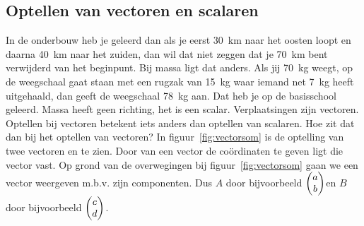 \documentclass[../main.tex]{subfiles}
\begin{document}
\begin{mdframed}[style=wiskader,frametitle=\section*{Wiskundekader~1: vectoren}]
\subsection*{Optellen van vectoren en scalaren}
In de onderbouw heb je geleerd dan als je eerst \SI{30}{\kilo\meter} naar het oosten loopt en daarna \SI{40}{\kilo\meter} naar het zuiden, dan wil dat niet zeggen dat je \SI{70}{\kilo\meter} bent verwijderd van het beginpunt. Bij massa ligt dat anders. Als jij \SI{70}{\kilo\gram} weegt, op de weegschaal gaat staan met een rugzak van \SI{15}{\kilo\gram} waar iemand net \SI{7}{\kilo\gram} heeft uitgehaald, dan geeft de weegschaal \SI{78}{\kilo\gram} aan. Dat heb je op de basisschool geleerd. Massa heeft geen richting, het is een scalar.  Verplaatsingen zijn vectoren. Optellen bij vectoren betekent iets anders dan optellen van scalaren. Hoe zit dat dan bij het optellen van vectoren? In figuur~\ref{fig:vectorsom} is de optelling van twee vectoren  en  te zien.
\iffalse%
\marginnote{\vspace{5cm}\texttt{[image: ./img/vectorsom.png]}
 \captionof{figure}{Optellen van vectoren.
Parallellogram-methode of kop aan staart methode. Maar ook is mogelijk: x-componenten optellen en y-componenten optellen.
 \label {fig:vectorsom}}}
\fi%
Door van een vector de co\"ordinaten te geven ligt die vector vast. 
Op grond van de overwegingen bij figuur~\ref{fig:vectorsom} gaan we een vector weergeven m.b.v. zijn componenten. Dus $A$ door bijvoorbeeld
$\mqty(a\\b)$en $B$ door bijvoorbeeld
$\mqty(c\\d)$.


\end{mdframed}
\end{document}

